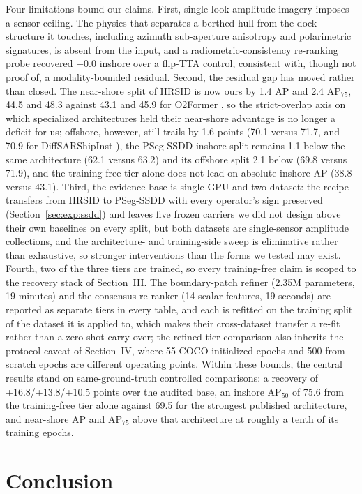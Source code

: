 Four limitations bound our claims. First, single-look amplitude imagery imposes a sensor ceiling. The physics that separates a berthed hull from the dock structure it touches, including azimuth sub-aperture anisotropy and polarimetric signatures, is absent from the input, and a radiometric-consistency re-ranking probe recovered +0.0 inshore over a flip-TTA control, consistent with, though not proof of, a modality-bounded residual. Second, the residual gap has moved rather than closed. The near-shore split of HRSID is now ours by 1.4 AP and 2.4 AP$_{75}$, 44.5 and 48.3 against 43.1 and 45.9 for O2Former \cite{o2former2025}, so the strict-overlap axis on which specialized architectures held their near-shore advantage is no longer a deficit for us; offshore, however, still trails by 1.6 points (70.1 versus 71.7, and 70.9 for DiffSARShipInst \cite{diffsar2025}), the PSeg-SSDD inshore split remains 1.1 below the same architecture (62.1 versus 63.2) and its offshore split 2.1 below (69.8 versus 71.9), and the training-free tier alone does not lead on absolute inshore AP (38.8 versus 43.1). Third, the evidence base is single-GPU and two-dataset: the recipe transfers from HRSID to PSeg-SSDD with every operator's sign preserved (Section~\ref{sec:exp:ssdd}) and leaves five frozen carriers we did not design above their own baselines on every split, but both datasets are single-sensor amplitude collections, and the architecture- and training-side sweep is eliminative rather than exhaustive, so stronger interventions than the forms we tested may exist. Fourth, two of the three tiers are trained, so every training-free claim is scoped to the recovery stack of Section~III. The boundary-patch refiner (2.35M parameters, 19 minutes) and the consensus re-ranker (14 scalar features, 19 seconds) are reported as separate tiers in every table, and each is refitted on the training split of the dataset it is applied to, which makes their cross-dataset transfer a re-fit rather than a zero-shot carry-over; the refined-tier comparison also inherits the protocol caveat of Section~IV, where 55 COCO-initialized epochs and 500 from-scratch epochs are different operating points. Within these bounds, the central results stand on same-ground-truth controlled comparisons: a recovery of +16.8/+13.8/+10.5 points over the audited base, an inshore AP$_{50}$ of 75.6 from the training-free tier alone against 69.5 for the strongest published architecture, and near-shore AP and AP$_{75}$ above that architecture at roughly a tenth of its training epochs.

\section{Conclusion}
\label{sec:conclusion}

